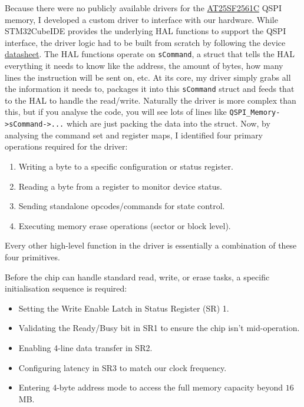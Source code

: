 Because there were no publicly available drivers for the \href{https://www.renesas.com/en/products/at25sf2561c/part-details/at25sf2561c-mwub-t}{AT25SF2561C} QSPI memory, I developed a custom driver to interface with our hardware. While STM32CubeIDE provides the underlying HAL functions to support the QSPI interface, the driver logic had to be built from scratch by following the device \href{https://www.renesas.com/en/document/dst/at25sf2561cat25qf2561c-datasheet?r=25559121}{datasheet}.
\nl
The HAL functions operate on \verb|sCommand|, a struct that tells the HAL everything it needs to know like the address, the amount of bytes, how many lines the instruction will be sent on, etc. At its core, my driver simply grabs all the information it needs to, packages it into this \verb|sCommand| struct and feeds that to the HAL to handle the read/write.
Naturally the driver is more complex than this, but if you analyse the code, you will see lots of lines like \verb|QSPI_Memory->sCommand->...| which are just packing the data into the struct.
\nl
Now, by analysing the command set and register maps, I identified four primary operations required for the driver:
\begin{enumerate}[label=(\roman*)]
    \item Writing a byte to a specific configuration or status register.
    \item Reading a byte from a register to monitor device status.
    \item Sending standalone opcodes/commands for state control.
    \item Executing memory erase operations (sector or block level).
\end{enumerate}
Every other high-level function in the driver is essentially a combination of these four primitives.

Before the chip can handle standard read, write, or erase tasks, a specific initialisation sequence is required:
\begin{itemize}
    \item Setting the Write Enable Latch in Status Register (SR) 1.
    \item Validating the Ready/Busy bit in SR1 to ensure the chip isn't mid-operation.
    \item Enabling 4-line data transfer in SR2.
    \item Configuring latency in SR3 to match our clock frequency.
    \item Entering 4-byte address mode to access the full memory capacity beyond $16$\,MB.
\end{itemize}

